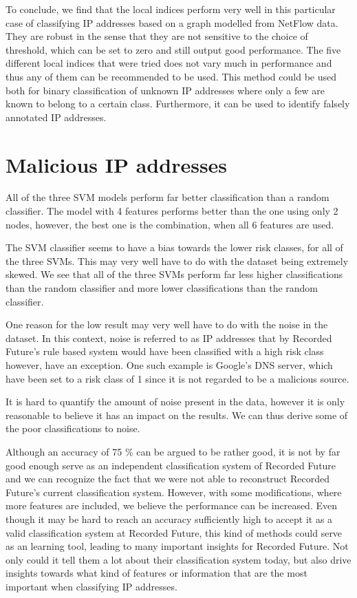 To conclude, we find that the local indices perform very well in this particular case of classifying IP addresses based on a graph modelled from NetFlow data. They are robust in the sense that they are not sensitive to the choice of threshold, which can be set to zero and still output good performance. The five different local indices that were tried does not vary much in performance and thus any of them can be recommended to be used. This method could be used both for binary classification of unknown IP addresses where only a few are known to belong to a certain class. Furthermore, it can be used to identify falsely annotated IP addresses. 

\section{Malicious IP addresses}
All of the three SVM models perform far better classification than a random classifier. The model with 4 features performs better than the one using only 2 nodes, however, the best one is the combination, when all 6 features are used. 

The SVM classifier seems to have a bias towards the lower risk classes, for all of the three SVMs. This may very well have to do with the dataset being extremely skewed. We see that all of the three SVMs perform far less higher classifications than the random classifier and more lower classifications than the random classifier.

One reason for the low result may very well have to do with the noise in the dataset. In this context, noise is referred to as IP addresses that by Recorded Future's rule based system would have been classified with a high risk class however, have an exception. One such example is Google's DNS server, which have been set to a risk class of 1 since it is not regarded to be a malicious source. 

It is hard to quantify the amount of noise present in the data, however it is only reasonable to believe it has an impact on the results. We can thus derive some of the poor classifications to noise. 

Although an accuracy of 75 \% can be argued to be rather good, it is not by far good enough serve as an independent classification system of Recorded Future and we can recognize the fact that we were not able to reconstruct Recorded Future's current classification system. However, with some modifications, where more features are included, we believe the performance can be increased. Even though it may be hard to reach an accuracy sufficiently high to accept it as a valid classification system at Recorded Future, this kind of methods could serve as an learning tool, leading to many important insights for Recorded Future. Not only could it tell them a lot about their classification system today, but also drive insights towards what kind of features or information that are the most important when classifying IP addresses.

